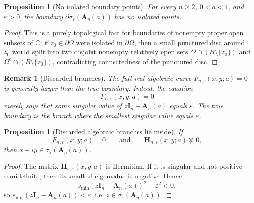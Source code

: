 \documentclass[11pt]{article}
\newtheorem{proposition}[theorem]{Proposition}
\newtheorem{remark}[theorem]{Remark}
\newcommand{\C}{\mathbb{C}}
\begin{document}
\begin{proposition}[No isolated boundary points]\label{prop:no-isolated}
For every \(n\ge 2\), \(0<a<1\), and \(\varepsilon>0\), the boundary \(\partial \sigma_\varepsilon(\mathbf A_n(a))\) has no isolated points.
\end{proposition}

\begin{proof}
This is a purely topological fact for boundaries of nonempty proper open subsets of \(\C\): if \(z_0\in \partial\Omega\) were isolated in \(\partial\Omega\), then a small punctured disc around \(z_0\) would split into two disjoint nonempty relatively open sets \(\Omega\cap(B\setminus\{z_0\})\) and \(\Omega^c\cap(B\setminus\{z_0\})\), contradicting connectedness of the punctured disc.
\end{proof}

\begin{remark}[Discarded branches]\label{rem:discarded-branches}
The full real algebraic curve \(F_{n,\varepsilon}(x,y;a)=0\) is generally larger than the true boundary. Indeed, the equation
\[
F_{n,\varepsilon}(x,y;a)=0
\]
merely says that \emph{some} singular value of \(z\mathbf I_n-\mathbf A_n(a)\) equals \(\varepsilon\). The true boundary is the branch where the \emph{smallest} singular value equals \(\varepsilon\).
\end{remark}

\begin{proposition}[Discarded algebraic branches lie inside]\label{prop:discarded-inside}
If
\[
F_{n,\varepsilon}(x,y;a)=0
\qquad\text{and}\qquad
\mathbf H_{n,\varepsilon}(x,y;a)\not\succeq 0,
\]
then \(x+iy\in \sigma_\varepsilon(\mathbf A_n(a))\).
\end{proposition}

\begin{proof}
The matrix \(\mathbf H_{n,\varepsilon}(x,y;a)\) is Hermitian. If it is singular and not positive semidefinite, then its smallest eigenvalue is negative. Hence
\[
s_{\min}(z\mathbf I_n-\mathbf A_n(a))^2-\varepsilon^2<0,
\]
so \(s_{\min}(z\mathbf I_n-\mathbf A_n(a))<\varepsilon\), i.e. \(z\in \sigma_\varepsilon(\mathbf A_n(a))\).
\end{proof}
\end{document}
